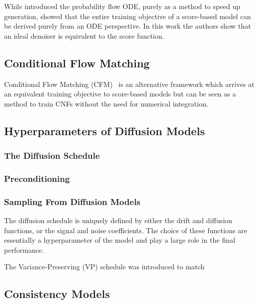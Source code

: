 While \textcite{ScoreBasedGenerativeModeling} introduced the probability flow ODE, purely as a method to speed up generation, \textcite{ElucidatingDesignSpace} showed that the entire training objective of a score-based model can be derived purely from an ODE perspective.
In this work the authors show that an ideal denoiser is equivalent to the score function.

\subsection{Conditional Flow Matching}

Conditional Flow Matching (CFM)~\cite{FlowMatchingGenerative, FlowStraightFast} is an alternative framework which arrives at an equivalent training objective to score-based models but can be seen as a method to train CNFs without the need for numerical integration.





\subsection{Hyperparameters of Diffusion Models}
\subsubsection{The Diffusion Schedule}
\subsubsection{Preconditioning}
\subsubsection{Sampling From Diffusion Models}

The diffusion schedule is uniquely defined by either the drift and diffusion functions, or the signal and noise coefficients.
The choice of these functions are essentially a hyperparameter of the model and play a large role in the final performance.

The Variance-Preserving (VP) schedule was introduced to match


\subsection{Consistency Models}
